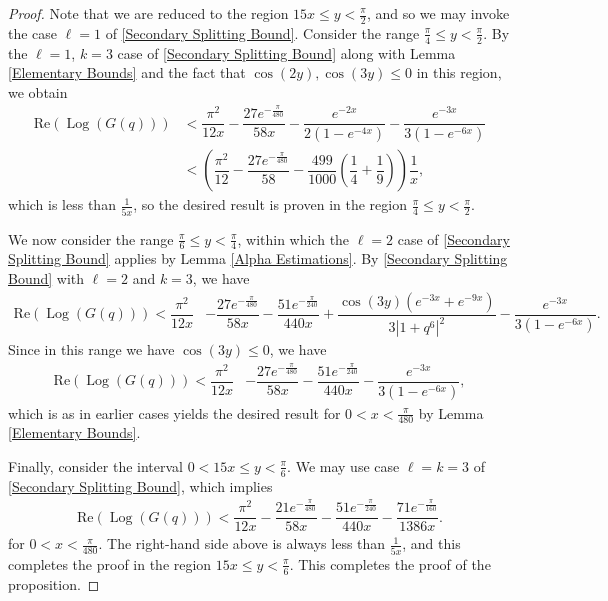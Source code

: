 \documentclass[11pt,reqno]{amsart}
\theoremstyle{definition}
\theoremstyle{plain}
\theoremstyle{named}
\DeclareMathOperator\Log{Log}
\numberwithin{equation}{section}
\theoremstyle{example}
\def\lp{\left(}
\def\rp{\right)}
\begin{document}
\begin{proof}
Note that we are reduced to the region $15x \leq y < \frac{\pi}{2}$, and so we may invoke the case $\ell = 1$ of \eqref{Secondary Splitting Bound}. Consider the range $\frac{\pi}{4} \leq y < \frac{\pi}{2}$. By the $\ell=1$, $k=3$ case of \eqref{Secondary Splitting Bound} along with Lemma \ref{Elementary Bounds} and the fact that $\cos\lp 2y \rp, \cos\lp 3y \rp \leq 0$ in this region, we obtain
\begin{align*}
    \mathrm{Re}\lp \Log\lp G(q) \rp \rp &< \dfrac{\pi^2}{12x} - \dfrac{27 e^{-\frac{\pi}{480}}}{58x} - \dfrac{e^{-2x}}{2\lp 1 - e^{-4x} \rp} - \dfrac{e^{-3x}}{3\lp 1 - e^{-6x} \rp} \\ &< \lp \dfrac{\pi^2}{12} - \dfrac{27 e^{-\frac{\pi}{480}}}{58} - \dfrac{499}{1000}\lp \dfrac{1}{4} + \dfrac 19 \rp \rp \dfrac{1}{x},
\end{align*}
which is less than $\frac{1}{5x}$, so the desired result is proven in the region $\frac{\pi}{4} \leq y < \frac{\pi}{2}$.

We now consider the range $\frac{\pi}{6} \leq y < \frac{\pi}{4}$, within which the $\ell = 2$ case of \eqref{Secondary Splitting Bound} applies by Lemma \ref{Alpha Estimations}. By \eqref{Secondary Splitting Bound} with $\ell = 2$ and $k = 3$, we have
\begin{align*}
    \mathrm{Re}\lp \Log\lp G(q) \rp \rp < \dfrac{\pi^2}{12x} &- \dfrac{27 e^{-\frac{\pi}{480}}}{58x} - \dfrac{51 e^{- \frac{\pi}{240}}}{440x} + \dfrac{\cos\lp 3y \rp \lp e^{-3x} + e^{-9x} \rp}{3 \left| 1 + q^6 \right|^2} - \dfrac{e^{-3x}}{3\lp 1 - e^{-6x} \rp}.
\end{align*}
Since in this range we have $\cos\lp 3y \rp \leq 0$, we have
\begin{align*}
    \mathrm{Re}\lp \Log\lp G(q) \rp \rp < \dfrac{\pi^2}{12x} &- \dfrac{27 e^{-\frac{\pi}{480}}}{58x} - \dfrac{51 e^{- \frac{\pi}{240}}}{440x} - \dfrac{e^{-3x}}{3\lp 1 - e^{-6x} \rp},
\end{align*}
which is as in earlier cases yields the desired result for $0 < x < \frac{\pi}{480}$ by Lemma \ref{Elementary Bounds}.

Finally, consider the interval $0 < 15x \leq y < \frac{\pi}{6}$. We may use case $\ell = k = 3$ of \eqref{Secondary Splitting Bound}, which implies
\begin{align*}
    \mathrm{Re}\lp \Log\lp G(q) \rp \rp < \dfrac{\pi^2}{12x} - \dfrac{21 e^{-\frac{\pi}{480}}}{58x} - \dfrac{51 e^{-\frac{\pi}{240}}}{440x} - \dfrac{71 e^{-\frac{\pi}{160}}}{1386x}.
\end{align*}
for $0 < x < \frac{\pi}{480}$. The right-hand side above is always less than $\frac{1}{5x}$, and this completes the proof in the region $15x \leq y < \frac{\pi}{6}$. This completes the proof of the proposition.
\end{proof}
\end{document}
